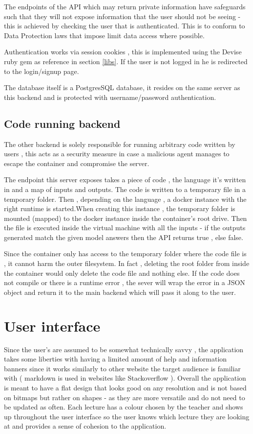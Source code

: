 The endpoints of the API which may return private information have safeguards such that they will not expose information that the user should not be seeing - this is achieved by checking the user that is authenticated. This is to conform to Data Protection laws that impose limit data access where possible.

Authentication works via session cookies , this is implemented using the Devise ruby gem as reference in section \ref{libs}. If the user is not logged in he is redirected to the login/signup page.

The database itself is a PostgresSQL database, it resides on the same server as this backend and is protected with username/password authentication.

\subsection{Code running backend}
The other backend is solely responsible for running arbitrary code written by users , this acts as a security measure in case a malicious agent manages to escape the container and compromise the server.

The endpoint this server exposes takes a piece of code , the language it's written in and a map of inputs and outputs. The code is written to a temporary file in a temporary folder. Then , depending on the language , a docker instance with the right runtime is started.When creating this instance , the temporary folder is mounted (mapped) to the docker instance inside the container's root drive. Then the file is executed inside the virtual machine with all the inputs - if the outputs generated match the given model answers then the API returns true , else false. 

Since the container only has access to the temporary folder where the code file is , it cannot harm the outer filesystem. In fact , deleting the root folder from inside the container would only delete the code file and nothing else.
If the code does not compile or there is a runtime error , the sever will wrap the error in a JSON object and return it to the main backend which will pass it along to the user.




\section{User interface}
Since the user's are assumed to be somewhat technically savvy , the application takes some liberties with having a limited amount of help and information banners since it works similarly to other website the target audience is familiar with ( markdown is used in websites like Stackoverflow \cite{stackoverflow} ).
Overall the application is meant to have a flat design that looks good on any resolution and is not based on bitmaps but rather on shapes - as they are more versatile and do not need to be updated as often.
Each lecture has a colour chosen by the teacher and shows up throughout the user interface so the user knows which lecture they are looking at and provides a sense of cohesion to the application.


